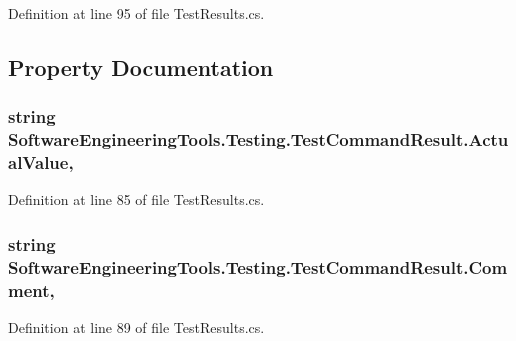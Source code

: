 Definition at line 95 of file Test\+Results.\+cs.



\subsection{Property Documentation}
\hypertarget{class_software_engineering_tools_1_1_testing_1_1_test_command_result_ae17ea10460ef9dacbd3cbe9345e0f9ed}{
\subsubsection[{Actual\+Value}]{\setlength{\rightskip}{0pt plus 5cm}string Software\+Engineering\+Tools.\+Testing.\+Test\+Command\+Result.\+Actual\+Value\hspace{0.3cm}{\ttfamily [get]}, {\ttfamily [set]}}}\label{class_software_engineering_tools_1_1_testing_1_1_test_command_result_ae17ea10460ef9dacbd3cbe9345e0f9ed}


Definition at line 85 of file Test\+Results.\+cs.

\hypertarget{class_software_engineering_tools_1_1_testing_1_1_test_command_result_a02274834bcb07e11f6027e5371cacc9c}{
\subsubsection[{Comment}]{\setlength{\rightskip}{0pt plus 5cm}string Software\+Engineering\+Tools.\+Testing.\+Test\+Command\+Result.\+Comment\hspace{0.3cm}{\ttfamily [get]}, {\ttfamily [set]}}}\label{class_software_engineering_tools_1_1_testing_1_1_test_command_result_a02274834bcb07e11f6027e5371cacc9c}


Definition at line 89 of file Test\+Results.\+cs.

